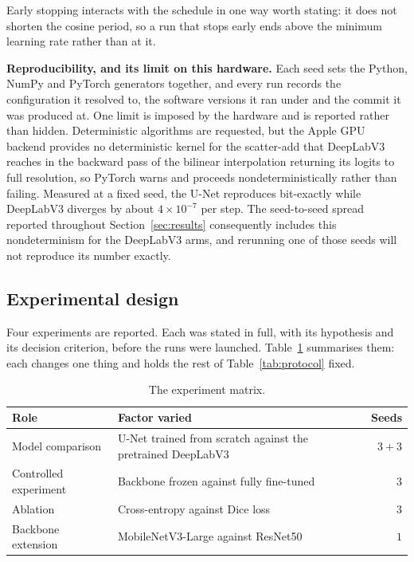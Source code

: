 Early stopping interacts with the schedule in one way worth stating: it does not shorten the
cosine period, so a run that stops early ends above the minimum learning rate rather than at it.

\textbf{Reproducibility, and its limit on this hardware.} Each seed sets the Python, NumPy and
PyTorch generators together, and every run records the configuration it resolved to, the software
versions it ran under and the commit it was produced at. One limit is imposed by the hardware and
is reported rather than hidden. Deterministic algorithms are requested, but the Apple GPU backend
provides no deterministic kernel for the scatter-add that DeepLabV3 reaches in the backward pass
of the bilinear interpolation returning its logits to full resolution, so PyTorch warns and
proceeds nondeterministically rather than failing.
Measured at a fixed seed, the U-Net reproduces bit-exactly while DeepLabV3 diverges by about
$4 \times 10^{-7}$ per step. The seed-to-seed spread reported throughout
Section~\ref{sec:results} consequently includes this nondeterminism for the DeepLabV3 arms, and
rerunning one of those seeds will not reproduce its number exactly.

\subsection{Experimental design}
\label{subsec:methodology-4}

Four experiments are reported. Each was stated in full, with its hypothesis and its decision
criterion, before the runs were launched. Table~\ref{tab:experiments} summarises them: each
changes one thing and holds the rest of Table~\ref{tab:protocol} fixed.

\begin{table}[H]
\centering
\caption{The experiment matrix.}
\label{tab:experiments}
\small
\begin{tabularx}{\textwidth}{lXr}
\hline
\textbf{Role} & \textbf{Factor varied} & \textbf{Seeds} \\
\hline
Model comparison       & U-Net trained from scratch against the pretrained DeepLabV3 & $3 + 3$ \\
Controlled experiment  & Backbone frozen against fully fine-tuned & $3$ \\
Ablation               & Cross-entropy against Dice loss & $3$ \\
Backbone extension     & MobileNetV3-Large against ResNet50 & $1$ \\
\hline
\end{tabularx}
\end{table}

